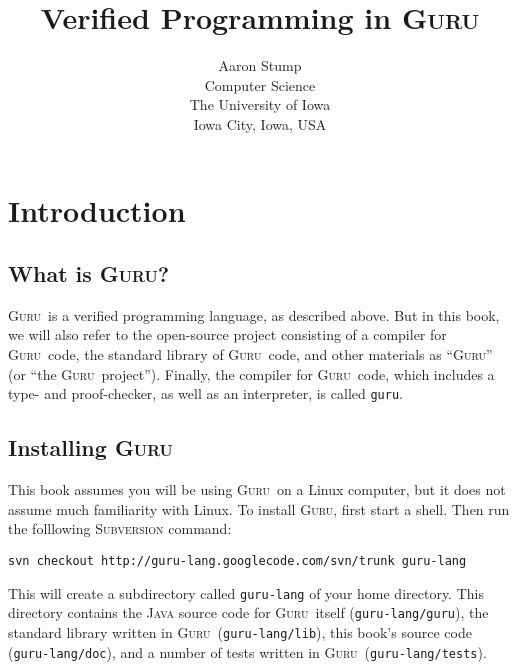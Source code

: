 \documentclass{book}[12pt]
\newcommand{\guru}[0]{\textsc{Guru}}
\begin{document}
\title{Verified Programming in \guru}

\author{Aaron Stump \\
Computer Science \\
The University of Iowa \\
Iowa City, Iowa, USA
}

\maketitle

\tableofcontents

\chapter{Introduction}
\label{ch1}

\section{What is \guru?}

\guru\ is a verified programming language, as described above.  But in
this book, we will also refer to the open-source project consisting of
a compiler for \guru\ code, the standard library of \guru\ code, and
other materials as ``\guru'' (or ``the \guru\ project'').  Finally,
the compiler for \guru\ code, which includes a type- and
proof-checker, as well as an interpreter, is called \texttt{guru}.

\section{Installing \guru}

This book assumes you will be using \guru\ on a Linux computer, but it
does not assume much familiarity with Linux.  To install \guru, first
start a shell. Then run the folllowing \textsc{Subversion} command:

\begin{verbatim}
svn checkout http://guru-lang.googlecode.com/svn/trunk guru-lang
\end{verbatim}

\noindent This will create a subdirectory called \texttt{guru-lang} of
your home directory.  This directory contains the \textsc{Java} source
code for \guru\ itself (\texttt{guru-lang/guru}), the standard library
written in \guru\ (\texttt{guru-lang/lib}), this book's source code
(\texttt{guru-lang/doc}), and a number of tests written in \guru\
(\texttt{guru-lang/tests}).
\end{document}
